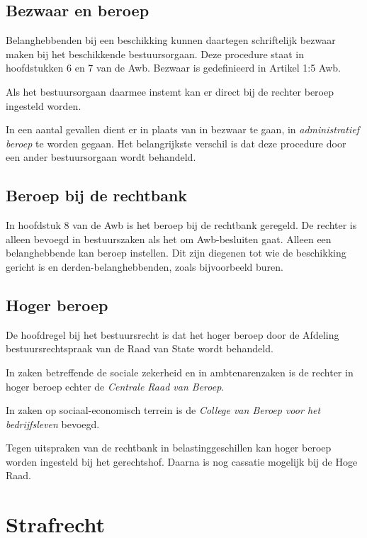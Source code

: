 \documentclass{article}
\begin{document}
\subsection{Bezwaar en beroep}

Belanghebbenden bij een beschikking kunnen daartegen schriftelijk bezwaar maken
bij het beschikkende bestuursorgaan. Deze procedure staat in hoofdstukken 6 en
7 van de Awb. Bezwaar is gedefinieerd in Artikel 1:5 Awb.

Als het bestuursorgaan daarmee instemt kan er direct bij de rechter beroep
ingesteld worden.

In een aantal gevallen dient er in plaats van in bezwaar te gaan, in
\emph{administratief beroep} te worden gegaan. Het belangrijkste verschil is
dat deze procedure door een ander bestuursorgaan wordt behandeld.

\subsection{Beroep bij de rechtbank}

In hoofdstuk 8 van de Awb is het beroep bij de rechtbank geregeld. De rechter
is alleen bevoegd in bestuurszaken als het om Awb-besluiten gaat. Alleen een
belanghebbende kan beroep instellen. Dit zijn diegenen tot wie de beschikking
gericht is en derden-belanghebbenden, zoals bijvoorbeeld buren.

\subsection{Hoger beroep}

De hoofdregel bij het bestuursrecht is dat het hoger beroep door de Afdeling
bestuursrechtspraak van de Raad van State wordt behandeld.

In zaken betreffende de sociale zekerheid en in ambtenarenzaken is de rechter
in hoger beroep echter de \emph{Centrale Raad van Beroep}.

In zaken op sociaal-economisch terrein is de \emph{College van Beroep voor het
bedrijfsleven} bevoegd.

Tegen uitspraken van de rechtbank in belastinggeschillen kan hoger beroep
worden ingesteld bij het gerechtshof. Daarna is nog cassatie mogelijk bij de
Hoge Raad.



\section{Strafrecht}
\end{document}
